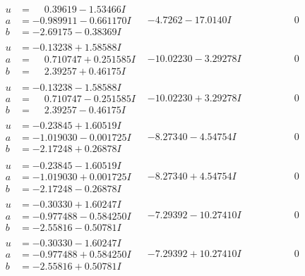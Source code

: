 \documentclass[1p]{elsarticle_modified}
\theoremstyle{definition}
\begin{document}
$$\begin{array}{c|c|c}
\begin{aligned}
u &= \phantom{-}0.39619 - 1.53466 I \\
a &= -0.989911 - 0.661170 I \\
b &= -2.69175 - 0.38369 I\end{aligned}
 & -4.7262 - 17.0140 I & \phantom{-0.000000 } 0 \\ \hline\begin{aligned}
u &= -0.13238 + 1.58588 I \\
a &= \phantom{-}0.710747 + 0.251585 I \\
b &= \phantom{-}2.39257 + 0.46175 I\end{aligned}
 & -10.02230 - 3.29278 I & \phantom{-0.000000 } 0 \\ \hline\begin{aligned}
u &= -0.13238 - 1.58588 I \\
a &= \phantom{-}0.710747 - 0.251585 I \\
b &= \phantom{-}2.39257 - 0.46175 I\end{aligned}
 & -10.02230 + 3.29278 I & \phantom{-0.000000 } 0 \\ \hline\begin{aligned}
u &= -0.23845 + 1.60519 I \\
a &= -1.019030 - 0.001725 I \\
b &= -2.17248 + 0.26878 I\end{aligned}
 & -8.27340 - 4.54754 I & \phantom{-0.000000 } 0 \\ \hline\begin{aligned}
u &= -0.23845 - 1.60519 I \\
a &= -1.019030 + 0.001725 I \\
b &= -2.17248 - 0.26878 I\end{aligned}
 & -8.27340 + 4.54754 I & \phantom{-0.000000 } 0 \\ \hline\begin{aligned}
u &= -0.30330 + 1.60247 I \\
a &= -0.977488 - 0.584250 I \\
b &= -2.55816 - 0.50781 I\end{aligned}
 & -7.29392 - 10.27410 I & \phantom{-0.000000 } 0 \\ \hline\begin{aligned}
u &= -0.30330 - 1.60247 I \\
a &= -0.977488 + 0.584250 I \\
b &= -2.55816 + 0.50781 I\end{aligned}
 & -7.29392 + 10.27410 I & \phantom{-0.000000 } 0\\

\end{array}$$
\end{document}
